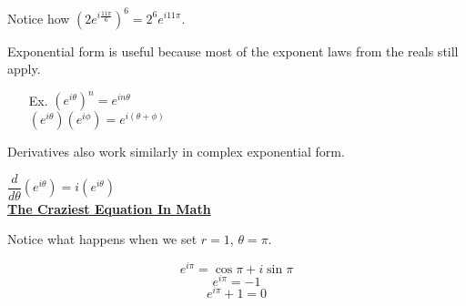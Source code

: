 \documentclass{letter}
\begin{document}
	Notice how $(2 e^{i \frac{11 \pi}{6}})^6 = 2^6 e^{i 11 \pi}$.
	
	Exponential form is useful because most of the exponent laws from the reals still apply.
	
	\begin{itemize}
		\item[Ex. ] $(e^{i \theta})^n = e^{in\theta}$\\
		$(e^{i\theta})(e^{i\phi}) = e^{i(\theta + \phi)}$
	\end{itemize}
	
	Derivatives also work similarly in complex exponential form.
	
	$\dfrac{d}{d\theta} (e^{i \theta}) = i(e^{i\theta})$\\
	
	\underline{\textbf{The Craziest Equation In Math}}
	
	Notice what happens when we set $r=1$, $\theta = \pi$.
	
	\[ e^{i \pi} = \cos \pi + i \sin \pi \]
	\[ e^{i \pi} = -1 \]
	\[ e^{i \pi} + 1 = 0 \]
\end{document}
